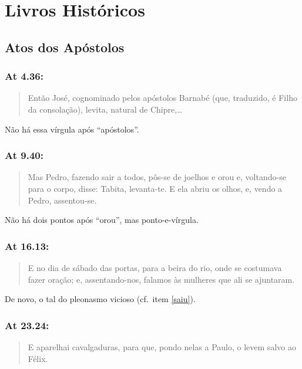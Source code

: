 \chapter{Livros Históricos}
\section{Atos dos Apóstolos}

\subsection*{At 4.36:}
\begin{quote}
    \small
Então José, cognominado pelos apóstolos\uwave{,} Barnabé (que, traduzido, é Filho da consolação), levita, natural de Chipre,\ldots
\end{quote}

Não há essa vírgula após ``apóstolos''.


\subsection*{At 9.40:}
\begin{quote}
    \small
Mas Pedro, fazendo sair a todos, pôs-se de joelhos e orou\uwave{:} e, voltando-se para o corpo, disse: Tabita, levanta-te. E ela abriu os olhos, e, vendo a Pedro, assentou-se.
\end{quote}

Não há dois pontos após ``orou'', mas ponto-e-vírgula.


\subsection*{At 16.13:}
\begin{quote}
    \small
E no dia de sábado  das portas, para a beira do rio, onde se costumava fazer oração; e, assentando-nos, falamos às mulheres que ali se ajuntaram.
\end{quote}

De novo, o tal do pleonasmo vicioso (cf.~item \ref{saiu}).


\subsection*{At 23.24:}
\begin{quote}
    \small
E aparelhai cavalgaduras, para que, pondo nelas a Paulo, o levem salvo ao  Félix.
\end{quote}

